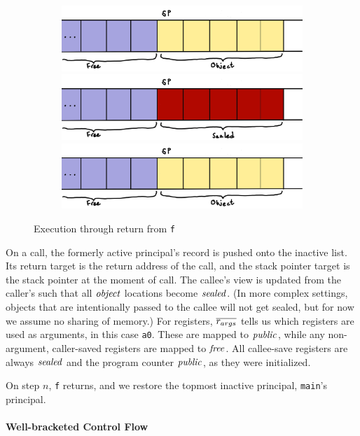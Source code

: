 \documentclass[10pt,conference]{ieeetran}%
\theoremstyle{definition}
\begin{document}
\begin{figure}
\begin{subfigure}[t]{.4\textwidth}
    \includegraphics[width=\columnwidth]{stack2.png}
    \includegraphics[width=\columnwidth]{stack3.png}
    \includegraphics[width=\columnwidth]{stack4.png}
  \end{subfigure}

\caption{Execution through return from {\tt f}}
\label{fig:exec1}
\end{figure}

On a call, the formerly active principal's record is pushed onto the inactive list.
Its return target is the return address of the call, 
and the stack pointer target is the stack pointer at the moment of call.
The callee's view is updated from the caller's such that all \(\mathit{object}\) locations
become \(\mathit{sealed}\). (In more complex settings, objects that are intentionally passed
to the callee will not get sealed, but for now we assume no sharing of memory.)
For registers, \(\overline{r_{args}}\) tells us which registers are used as arguments,
in this case {\tt a0}. These are mapped to \(\mathit{public}\), while any non-argument, caller-saved
registers are mapped to \(\mathit{free}\). All callee-save registers are always \(\mathit{sealed}\) and
the program counter \(\mathit{public}\), as they were initialized.

On step \(n\), {\tt f} returns, and we restore the topmost inactive principal,
{\tt main}'s principal.
         
\paragraph*{Well-bracketed Control Flow}
\end{document}
